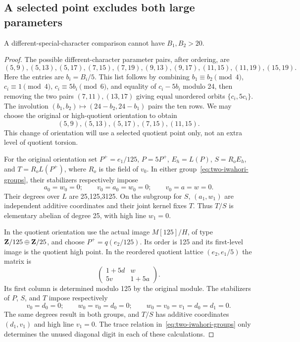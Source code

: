\subsection{A selected point excludes both large parameters}
\begin{proposition}\label{prop:both-large-excluded}
A different-special-character comparison cannot have $B_1,B_2>20$.
\end{proposition}
\begin{proof}
The possible different-character parameter pairs, after ordering, are
\[
 (5,9),(5,13),(5,17),(7,15),(7,19),
 (9,13),(9,17),(11,15),(11,19),(15,19).
\]
Here the entries are $b_i=B_i/5$. This list follows by combining $b_1\equiv b_2\pmod4$, $c_i\equiv1\pmod4$, $c_i\equiv5b_i\pmod6$, and equality of $c_i-5b_i$ modulo 24, then removing the two pairs $(7,11),(13,17)$ giving equal unordered orbits $\{c_i,5c_i\}$. The involution $(b_1,b_2)\mapsto(24-b_2,24-b_1)$ pairs the ten rows. We may choose the original or high-quotient orientation to obtain
\begin{equation}\label{eq:large-five-pairs}
                    (5,9),(5,13),(5,17),(7,15),(11,15).
\end{equation}
This change of orientation will use a selected quotient point only, not an extra level of quotient torsion.

For the original orientation set $P^+=e_1/125$, $P=5P^+$, $E_h=L(P)$, $S=R_oE_h$, and $T=R_oL(P^+)$, where $R_o$ is the field of $v_0$. In either group~\eqref{eq:two-iwahori-groups}, their stabilizers respectively impose
\[
 a_0=w_0=0;\qquad v_0=a_0=w_0=0;\qquad v_0=a=w=0.
\]
Their degrees over $L$ are 25,125,3125. On the subgroup for $S$, $(a_1,w_1)$ are independent additive coordinates and their joint kernel fixes $T$. Thus $T/S$ is elementary abelian of degree 25, with high line $w_1=0$.

In the quotient orientation use the actual image $M[125]/H$, of type $\mathbf Z/125\oplus\mathbf Z/25$, and choose $P^+=q(e_2/125)$. Its order is 125 and its first-level image is the quotient high point. In the reordered quotient lattice $(e_2,e_1/5)$ the matrix is
\[
                 \begin{pmatrix}1+5d&w\\5v&1+5a\end{pmatrix}.
\]
Its first column is determined modulo 125 by the original module. The stabilizers of $P$, $S$, and $T$ impose respectively
\[
 v_0=d_0=0;\qquad w_0=v_0=d_0=0;\qquad
 w_0=v_0=v_1=d_0=d_1=0.
\]
The same degrees result in both groups, and $T/S$ has additive coordinates $(d_1,v_1)$ and high line $v_1=0$. The trace relation in~\eqref{eq:two-iwahori-groups} only determines the unused diagonal digit in each of these calculations.


\end{proof}
